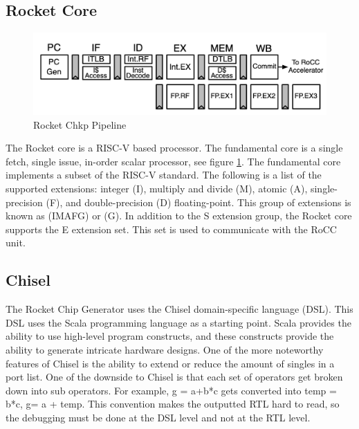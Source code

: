 \documentclass[../main.tex]{subfiles}
\begin{document}
\subsection{Rocket Core}
\begin{figure}
    \centering
    \includegraphics[scale=.4]{pngs/RocketPipeline.png}
    \caption{Rocket Chkp Pipeline\cite{Asanović:EECS-2016-17}}
    \label{fig:RocketCipFlow}
\end{figure}
The Rocket core is a RISC-V based processor. The fundamental core is a single fetch, single issue, in-order scalar processor, see figure \ref{fig:RocketCipFlow}. The fundamental core implements a subset of the RISC-V standard. The following is a list of the supported extensions: integer (I), multiply and divide (M), atomic (A), single-precision (F), and double-precision (D) floating-point. This group of extensions is known as (IMAFG) or (G)\cite{Asanović:EECS-2016-17}. In addition to the S extension group, the Rocket core supports the E extension set. This set is used to communicate with the RoCC unit.  %


\subsection{Chisel}
The Rocket Chip Generator uses the Chisel domain-specific language (DSL). This DSL uses the Scala programming language as a starting point. Scala provides the ability to use high-level program constructs, and these constructs provide the ability to generate intricate hardware designs. One of the more noteworthy features of Chisel is the ability to extend or reduce the amount of singles in a port list. One of the downside to Chisel is that each set of operators get broken down into sub operators. For example, g = a+b*c gets converted into temp = b*c, g= a + temp. This convention makes the outputted RTL hard to read, so the debugging must be done at the DSL level and not at the RTL level.   
\end{document}
